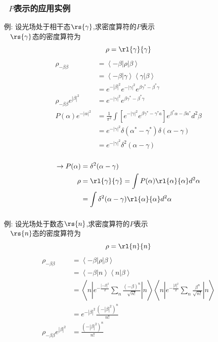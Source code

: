    \begin{frame} 
    \frametitle{~$P$表示的应用实例}
    例: 设光场处于相干态$\rs{\gamma}$,求密度算符的$P$表示\\ 
    \解~ $\rs{\gamma}$态的密度算符为
    \[ \rho = \rl{\gamma}{\gamma}\]
    \[ \begin{aligned}
      \rho_{-\beta \beta} &= \left\langle -\beta|\rho | \beta \right\rangle \\
      &= \left\langle -\beta| \gamma \right\rangle \left\langle \gamma| \beta \right\rangle
      \\
      &=  e^{-\left|\beta\right|^2} e^{-\left|\gamma\right|^2} e^{\beta \gamma^* - \beta^*\gamma } \\ 
      \rho_{-\beta \beta} e^{\left|\beta\right|^2}  &=  e^{-\left|\gamma\right|^2} e^{\beta \gamma^* - \beta^*\gamma } \\ 
      P(\alpha) e^{-\left|\alpha\right|^2}&= \frac{1}{\pi^2}\int [ e^{-\left|\gamma\right|^2} e^{\beta \gamma^* - \gamma^* a}  ]  e^{\beta^* \alpha - \beta a^*}  d^2 \beta \\ 
      &= e^{-\left|\gamma\right|^2} \delta(\alpha^*-\gamma^*) \delta(\alpha-\gamma) \\ 
      &= e^{-\left|\gamma\right|^2} \delta^2(\alpha-\gamma)
    \end{aligned}\] 
    \end{frame}
  
    \begin{frame} 
    \frametitle{}
    \[ \begin{aligned}
      \to P(\alpha) & = \delta^2(\alpha-\gamma)\\ 
      \rho &= \rl{\gamma}{\gamma}= \int P(\alpha) \rl{\alpha}{\alpha}  d^2 \alpha \\ 
      &= \int \delta^2(\alpha-\gamma)\rl{\alpha}{\alpha}  d^2 \alpha
    \end{aligned}\]  
    \end{frame}

    \begin{frame} 
    \frametitle{}
    例: 设光场处于数态$\rs{n}$,求密度算符的$P$表示\\ 
    \解~ $\rs{n}$态的密度算符为
    \[ \rho = \rl{n}{n}\]
    \[ \begin{aligned}
      \rho_{-\beta \beta} &= \left\langle -\beta|\rho | \beta \right\rangle \\
      &= \left\langle -\beta | n \right\rangle \left\langle n | \beta \right\rangle \\ 
      &= \left\langle n| e^{-\frac{\left|-\beta\right|^2}{2}}  \sum_n \frac{(-\beta)^n}{\sqrt{n!}}| n \right\rangle \left\langle n | e^{-\frac{\left|\beta\right|^2}{2}}  \sum_n \frac{\beta^n}{\sqrt{n!}} |n \right\rangle\\ 
      &= e^{-\left|\beta\right|^2} \frac{(- \left|\beta\right|^2)^n}{n!}\\ 
      \rho_{-\beta \beta} e^{\left|\beta\right|^2} &= \frac{(- \left|\beta\right|^2)^n}{n!}\\ 
    \end{aligned}\]   
    \end{frame}

